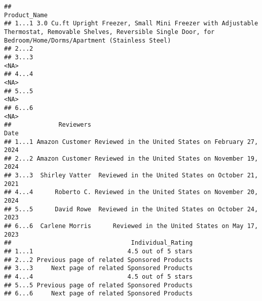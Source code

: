 \documentclass[
  11pt,
]{article}
\begin{document}
\begin{verbatim}
##                                                                                                                                                                  Product_Name
## 1...1 3.0 Cu.ft Upright Freezer, Small Mini Freezer with Adjustable Thermostat, Removable Shelves, Reversible Single Door, for Bedroom/Home/Dorms/Apartment (Stainless Steel)
## 2...2                                                                                                                                                                        
## 3...3                                                                                                                                                                    <NA>
## 4...4                                                                                                                                                                    <NA>
## 5...5                                                                                                                                                                    <NA>
## 6...6                                                                                                                                                                    <NA>
##             Reviewers                                               Date
## 1...1 Amazon Customer Reviewed in the United States on February 27, 2024
## 2...2 Amazon Customer Reviewed in the United States on November 19, 2024
## 3...3  Shirley Vatter  Reviewed in the United States on October 21, 2021
## 4...4      Roberto C. Reviewed in the United States on November 20, 2024
## 5...5      David Rowe  Reviewed in the United States on October 24, 2023
## 6...6  Carlene Morris      Reviewed in the United States on May 17, 2023
##                                 Individual_Rating
## 1...1                          4.5 out of 5 stars
## 2...2 Previous page of related Sponsored Products
## 3...3     Next page of related Sponsored Products
## 4...4                          4.5 out of 5 stars
## 5...5 Previous page of related Sponsored Products
## 6...6     Next page of related Sponsored Products

\end{verbatim}
\end{document}
